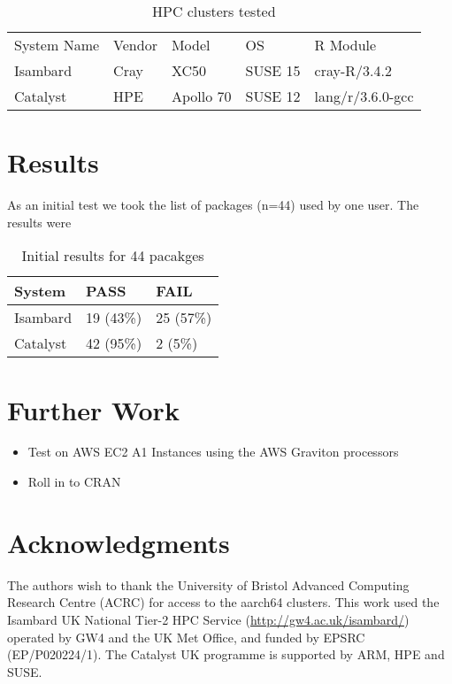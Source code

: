 \begin{table}[ht]
\centering
\begin{tabular}{lllll}
\cline{1-5}
System Name & Vendor & Model & OS & R Module \\ \cline{1-5}
Isambard & Cray & XC50 & SUSE 15 & cray-R/3.4.2 \\
Catalyst & HPE & Apollo 70 & SUSE 12 & lang/r/3.6.0-gcc \\ \cline{1-5}
\end{tabular}
\caption{HPC clusters tested }
\label{tab:systems}
\end{table}

\section{Results}

As an initial test we took the list of packages (n=44) used by one user. The results were

\begin{table}[ht]
\centering
\begin{tabular}{lll}
\hline
System & PASS & FAIL \\ \hline
Isambard & 19 (43\%) & 25 (57\%) \\
Catalyst & 42 (95\%) & 2 (5\%) \\ \hline
\end{tabular}
\caption{Initial results for 44 pacakges}
\label{tab:results-one-user}
\end{table}

\section{Further Work}

\begin{itemize}
    \item Test on AWS EC2 A1 Instances using the AWS Graviton processors
    \item Roll in to CRAN
\end{itemize}

\section{Acknowledgments}

The authors wish to thank the University of Bristol Advanced Computing
Research Centre (\textsc{ACRC}) for access to the aarch64 clusters. This
work used the Isambard UK National Tier-2 HPC Service
(\url{http://gw4.ac.uk/isambard/}) operated by GW4 and the UK Met Office, and
funded by EPSRC (EP/P020224/1). The Catalyst UK programme is supported by
ARM, HPE and SUSE.


